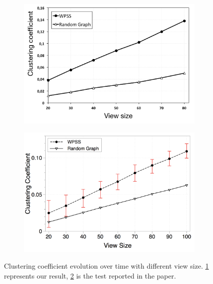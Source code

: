 \begin{figure}
\centering
\begin{subfigure}{.5\textwidth}
  \centering
  \includegraphics[keepaspectratio=true, width=1\linewidth]{images/converged_clustering_coefficient}
  \caption{}
  \label{fig:converged_clustering_coefficient}
\end{subfigure}%
\begin{subfigure}{.5\textwidth}
  \centering
  \includegraphics[keepaspectratio=true, width=1\linewidth]{images/paper_converged_clustering_coefficient}
  \caption{}
  \label{fig:paper_converged_clustering_coefficient}
\end{subfigure}
\caption{Clustering coefficient evolution over time with different view size. \ref{fig:converged_clustering_coefficient} represents our result, \ref{fig:paper_converged_clustering_coefficient} is the test reported in the paper.}
\label{fig:randomness_conv_clustering}
\end{figure}

